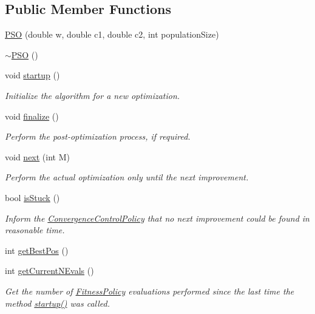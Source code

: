\subsection*{Public Member Functions}
\begin{DoxyCompactItemize}
\item 
\hyperlink{classPSO_ae56169385c687cb201e5f3d61f93b916}{P\+SO} (double w, double c1, double c2, int population\+Size)
\item 
\hyperlink{classPSO_a4d5d1e8b1cc91bac2f17e4559973e0c6}{$\sim$\+P\+SO} ()
\item 
void \hyperlink{classPSO_a8fb3e9a46396074cbbdc2d04a83783a5}{startup} ()
\begin{DoxyCompactList}\small\item\em Initialize the algorithm for a new optimization. \end{DoxyCompactList}\item 
void \hyperlink{classPSO_a4f30684c5cecc2c37f5ce822f146ffab}{finalize} ()
\begin{DoxyCompactList}\small\item\em Perform the post-\/optimization process, if required. \end{DoxyCompactList}\item 
void \hyperlink{classPSO_a25e15ab34186e7c52a4789108ae24ece}{next} (int M)
\begin{DoxyCompactList}\small\item\em Perform the actual optimization only until the next improvement. \end{DoxyCompactList}\item 
bool \hyperlink{classPSO_a5959db16a45b9a0ddc9289967936c306}{is\+Stuck} ()
\begin{DoxyCompactList}\small\item\em Inform the \hyperlink{classConvergenceControlPolicy}{Convergence\+Control\+Policy} that no next improvement could be found in reasonable time. \end{DoxyCompactList}\item 
int \hyperlink{classPSO_af47232c3034a05a2ab24e28f77196e45}{get\+Best\+Pos} ()
\item 
int \hyperlink{classPSO_a337161f54e6bb3cc3012f3f5d11f3716}{get\+Current\+N\+Evals} ()
\begin{DoxyCompactList}\small\item\em Get the number of \hyperlink{classFitnessPolicy}{Fitness\+Policy} evaluations performed since the last time the method \hyperlink{classPSO_a8fb3e9a46396074cbbdc2d04a83783a5}{startup()} was called. \end{DoxyCompactList}\item 

\end{DoxyCompactItemize}
